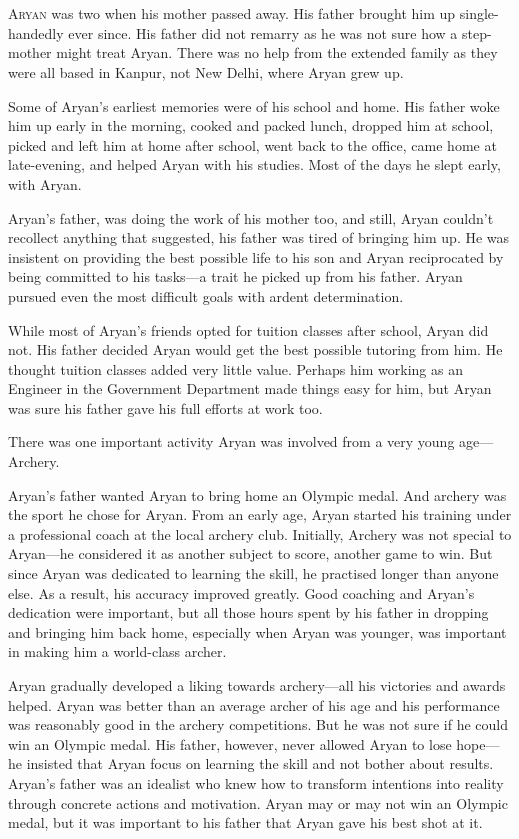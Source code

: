 \chapter{}

\lettrine{A}{ryan} was two when his mother passed away. His father brought him up
single-handedly ever since. His father did not remarry as he was not sure how a
step-mother might treat Aryan. There was no help from the extended family as
they were all based in Kanpur, not New Delhi, where Aryan grew up.

Some of Aryan's earliest memories were of his school and home. His father woke
him up early in the morning, cooked and packed lunch, dropped him at school,
picked and left him at home after school, went back to the office, came home at
late-evening, and helped Aryan with his studies. Most of the days he slept
early, with Aryan.

Aryan's father, was doing the work of his mother too, and still, Aryan couldn't
recollect anything that suggested, his father was tired of bringing him up. He
was insistent on providing the best possible life to his son and Aryan
reciprocated by being committed to his tasks—a trait he picked up from his
father. Aryan pursued even the most difficult goals with ardent determination.

While most of Aryan's friends opted for tuition classes after school, Aryan did
not. His father decided Aryan would get the best possible tutoring from him. He
thought tuition classes added very little value. Perhaps him working as an
Engineer in the Government Department made things easy for him, but Aryan was
sure his father gave his full efforts at work too.

There was one important activity Aryan was involved from a very young age—Archery.

Aryan's father wanted Aryan to bring home an Olympic medal. And archery was the
sport he chose for Aryan. From an early age, Aryan started his training under a
professional coach at the local archery club. Initially, Archery was not special
to Aryan—he considered it as another subject to score, another game to win.
But since Aryan was dedicated to learning the skill, he practised longer than
anyone else. As a result, his accuracy improved greatly. Good coaching and
Aryan's dedication were important, but all those hours spent by his father in
dropping and bringing him back home, especially when Aryan was younger, was
important in making him a world-class archer.

Aryan gradually developed a liking towards archery—all his victories and
awards helped. Aryan was better than an average archer of his age and his
performance was reasonably good in the archery competitions. But he was not sure
if he could win an Olympic medal. His father, however, never allowed Aryan to
lose hope—he insisted that Aryan focus on learning the skill and not bother
about results. Aryan's father was an idealist who knew how to transform
intentions into reality through concrete actions and motivation. Aryan may or may
not win an Olympic medal, but it was important to his father that Aryan gave his
best shot at it.


